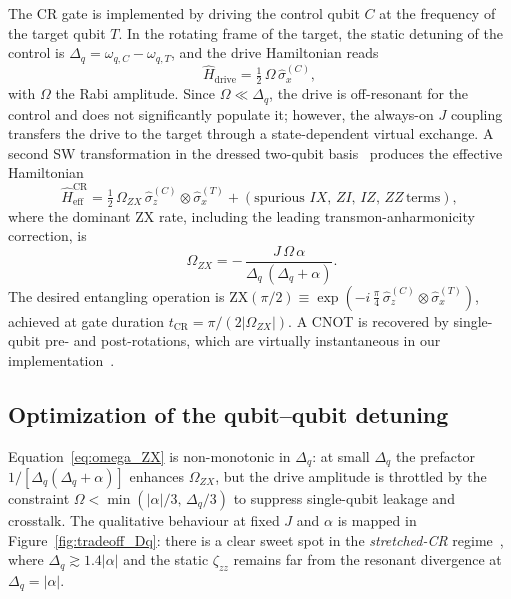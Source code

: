 The CR gate is implemented by driving the control qubit $C$ at the frequency
of the target qubit $T$. In the rotating frame of the target, the static
detuning of the control is $\Delta_q = \omega_{q,C} - \omega_{q,T}$, and the
drive Hamiltonian reads
\begin{equation}
\hat{H}_{\text{drive}} = \tfrac{1}{2}\,\Omega\,\hat{\sigma}_x^{(C)},
\end{equation}
with $\Omega$ the Rabi amplitude. Since $\Omega \ll \Delta_q$, the drive is
off-resonant for the control and does not significantly populate it; however,
the always-on $J$ coupling transfers the drive to the target through a
state-dependent virtual exchange. A second SW transformation in the dressed
two-qubit basis~\cite{Sheldon2016, blais2021circuit} produces the effective
Hamiltonian
\begin{equation}
\hat{H}_{\text{eff}}^{\text{CR}} = \tfrac{1}{2}\,\Omega_{ZX}\,
\hat{\sigma}_z^{(C)}\!\otimes\hat{\sigma}_x^{(T)}
+ (\text{spurious } IX,\, ZI,\, IZ,\, ZZ\, \text{terms}),
\end{equation}
where the dominant ZX rate, including the leading transmon-anharmonicity
correction, is~\cite{Sheldon2016}
\begin{equation}
\boxed{\;
\Omega_{ZX} = -\,\frac{J\,\Omega\,\alpha}{\Delta_q\,(\Delta_q + \alpha)}.
}
\label{eq:omega_ZX}
\end{equation}
The desired entangling operation is
$\mathrm{ZX}(\pi/2) \equiv \exp\!\left(-i\,\tfrac{\pi}{4}\,
\hat{\sigma}_z^{(C)}\!\otimes\hat{\sigma}_x^{(T)}\right)$, achieved at gate
duration $t_{\mathrm{CR}} = \pi/(2|\Omega_{ZX}|)$. A CNOT is recovered by
single-qubit pre- and post-rotations, which are virtually instantaneous in our
implementation~\cite{krantz2019}.

\subsection{Optimization of the qubit--qubit detuning}
\label{subsec:dq_optimization}

Equation~\eqref{eq:omega_ZX} is non-monotonic in $\Delta_q$: at small
$\Delta_q$ the prefactor $1/[\Delta_q(\Delta_q+\alpha)]$ enhances $\Omega_{ZX}$,
but the drive amplitude is throttled by the constraint
$\Omega < \min(|\alpha|/3,\,\Delta_q/3)$ to suppress single-qubit leakage and
crosstalk. The qualitative behaviour at fixed $J$ and $\alpha$ is mapped in
Figure~\ref{fig:tradeoff_Dq}: there is a clear sweet spot in the
\emph{stretched-CR} regime~\cite{Sheldon2016}, where $\Delta_q \gtrsim 1.4|\alpha|$
and the static $\zeta_{zz}$ remains far from the resonant divergence at
$\Delta_q = |\alpha|$.

